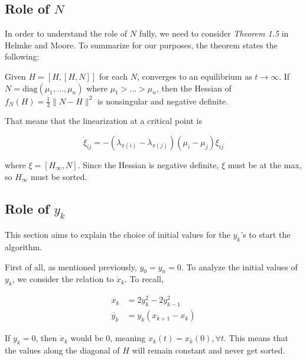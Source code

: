

%


\subsection{Role of $N$}
In order to understand the role of $N$ fully, we need to consider \textit{Theorem 1.5} in Helmke and Moore. To summarize for our purposes, the theorem states the following: 

Given $H = [H,[H,N]]$ for each $N$, converges to an equilibrium as $t\rightarrow \infty$. If $N=\text{diag} (\mu_1 , \dots , \mu_n)$ where $\mu_1 > \dots > \mu_n$, then the Hessian of $f_N(H) = \frac{1}{2}\|N-H\|^2$ is nonsingular and negative definite. 

That means that the linearization at a critical point is 

\[\dot \xi_{ij} = -(\lambda_{\pi(i)}-\lambda_{\pi(j)})(\mu_i-\mu_j)\xi_{ij}\]

where $\xi = [H_\infty, N]$. Since the Hessian is negative definite, $\xi$ must be at the max, so $H_\infty$ must be sorted. 



\subsection{Role of $y_k$}
This section aims to explain the choice of initial values for the $y_k$'s to start the algorithm.

First of all, as mentioned previously, $y_0=y_n=0$.
To analyze the initial values of $y_k$, we consider the relation to $\dot x_k$. To recall, 

\begin{align*}
    \dot{x_k} &=  2y^2_k-2y^2_{k-1} \\
    \dot{y_k} &= y_k(x_{k+1}-x_k) 
\end{align*}

If $y_k=0$, then $\dot x_k$ would be 0, meaning $x_k(t) = x_k(0), \forall t$. This means that the values along the diagonal of $H$ will remain constant and never get sorted. 

